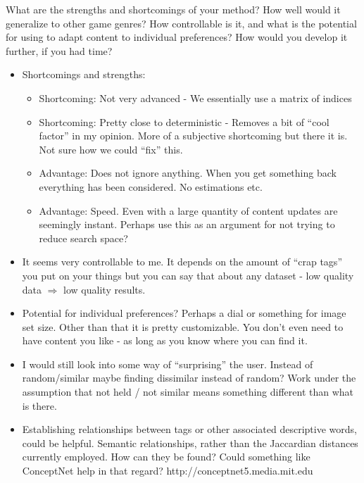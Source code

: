 \documentclass[]{article}
\begin{document}
\begin{framed}
What are the strengths and shortcomings of your method? How well would it generalize to other game genres? How controllable is it, and what is the potential for using to adapt content to individual preferences? How would you develop it further, if you had time?
\end{framed}
\begin{itemize}
\item Shortcomings and strengths:
	\begin{itemize}
	\item Shortcoming: Not very advanced - We essentially use a matrix of indices
	\item Shortcoming: Pretty close to deterministic - Removes a bit of ``cool factor'' in my opinion. More of a subjective shortcoming but there it is. Not sure how we could ``fix'' this.
	\item Advantage: Does not ignore anything. When you get something back everything has been considered. No estimations etc.
	\item Advantage: Speed. Even with a large quantity of content updates are seemingly instant. Perhaps use this as an argument for not trying to reduce search space?
	\end{itemize}
\item  It seems very controllable to me. It depends on the amount of ``crap tags'' you put on your things but you can say that about any dataset - low quality data $\Rightarrow$ low quality results. 
\item Potential for individual preferences? Perhaps a dial or something for image set size. Other than that it is pretty customizable. You don't even need to have content you like - as long as you know where you can find it.
\item I would still look into some way of ``surprising'' the user. Instead of random/similar maybe finding dissimilar instead of random? Work under the assumption that not held / not similar means something different than what is there.

\item Establishing relationships between tags or other associated descriptive words, could be helpful.  Semantic relationships, rather than the Jaccardian distances currently employed.  How can they be found?  Could something like ConceptNet help in that regard?  http://conceptnet5.media.mit.edu  

\end{itemize}
\end{document}
